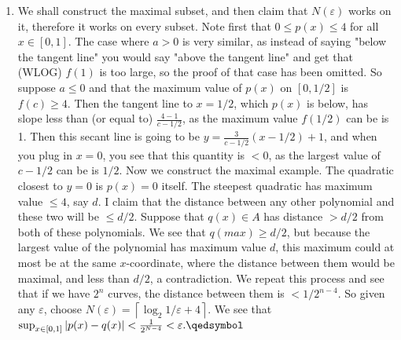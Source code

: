 \documentclass[12pt]{article}
\newcommand{\ceil}[1]{\left\lceil#1\right\rceil}
\theoremstyle{definition}
\theoremstyle{remark}
\newcommand{\ve}{\varepsilon}
\renewcommand{\qed}{\hfill\qedsymbol}
\renewcommand{\geq}{\geqslant}
\renewcommand{\leq}{\leqslant}
\begin{document}
\begin{enumerate}[leftmargin=\labelsep]
		\item 
		We shall construct the maximal subset, and then claim that $N(\ve)$ works on it, therefore it works on every subset. Note first that $0 \leq p(x) \leq 4$ for all $x \in [0,1]$. The case where $a > 0$ is very similar, as instead of saying "below the tangent line" you would say "above the tangent line" and get that (WLOG) $f(1)$ is too large, so the proof of that case has been omitted. So suppose $a \leq 0$ and that the maximum value of $p(x)$ on $[0, 1/2]$ is $f(c) \geq 4$. Then the tangent line to $x=1/2$, which $p(x)$ is below, has slope less than (or equal to) $\frac{4-1}{c-1/2}$, as the maximum value $f(1/2)$ can be is 1. Then this secant line is going to be $y=\frac3{c-1/2}(x-1/2)+1$, and when you plug in $x=0$, you see that this quantity is $<0$, as the largest value of $c-1/2$ can be is $1/2$. Now we construct the maximal example. The quadratic closest to $y=0$ is $p(x)=0$ itself. The steepest quadratic has maximum value $\leq 4$, say $d$. I claim that the distance between any other polynomial and these two will be $\leq d/2$. Suppose that $q(x) \in A$ has distance $>d/2$ from both of these polynomials. We see that $q(max) \geq d/2$, but because the largest value of the polynomial has maximum value $d$, this maximum could at most be at the same $x$-coordinate, where the distance between them would be maximal, and less than $d/2$, a contradiction. We repeat this process and see that if we have $2^n$ curves, the distance between them is $<1/2^{n-4}$. So given any $\ve$, choose $N(\ve) = \ceil{\log_2{1/\ve}+4}.$ We see that $\sup_{x\in[0,1]}|p(x)-q(x)| < \frac{1}{2^{N-4}} < \ve. \qed$
	\end{enumerate}
\end{document}
